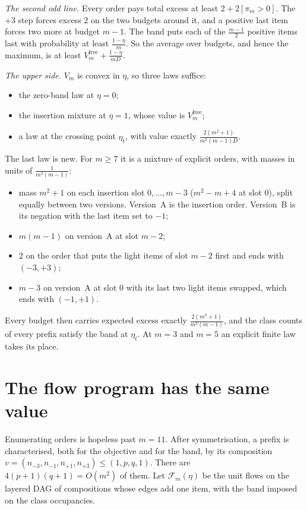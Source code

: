 \emph{The second odd line.} Every order pays total excess at least $2+2[\pi_{m}>0]$. The
$+3$ step forces excess $2$ on the two budgets around it, and a positive last item forces two
more at budget $m-1$. The band puts each of the $\frac{m-1}{2}$ positive items last with
probability at least $\frac{1-\eta}{m}$. So the average over budgets, and hence the maximum,
is at least $V^{\mathrm{free}}_{m}+\frac{1-\eta}{mD}$.

\emph{The upper side.} $V_{m}$ is convex in $\eta$, so three laws suffice:
\begin{itemize}
\item the zero-band law at $\eta=0$;
\item the insertion mixture at $\eta=1$, whose value is $V^{\mathrm{free}}_{m}$;
\item a law at the crossing point $\eta_{t}$, with value exactly
$\frac{2(m^{2}+1)}{m^{2}(m-1)D}$.
\end{itemize}
The last law is new. For $m\ge7$ it is a mixture of explicit orders, with masses in units of
$\frac{1}{m^{2}(m-1)}$:
\begin{itemize}
\item mass $m^{2}+1$ on each insertion slot $0,\dots,m-3$ ($m^{2}-m+4$ at slot $0$), split
equally between two versions. Version~A is the insertion order. Version~B is its negation
with the last item set to $-1$;
\item $m(m-1)$ on version~A at slot $m-2$;
\item $2$ on the order that puts the light items of slot $m-2$ first and ends with
$(-3,+3)$;
\item $m-3$ on version~A at slot $0$ with its last two light items swapped, which ends with
$(-1,+1)$.
\end{itemize}
Every budget then carries expected excess exactly $\frac{2(m^{2}+1)}{m^{2}(m-1)}$, and the
class counts of every prefix satisfy the band at $\eta_{t}$. At $m=3$ and $m=5$ an explicit
finite law takes its place.

\section{The flow program has the same value}
\label{sec:flow}

Enumerating orders is hopeless past $m=11$. After symmetrisation, a prefix is characterised,
both for the objective and for the band, by its composition
$v=(n_{-3},n_{-1},n_{+1},n_{+3})\le(1,p,q,1)$. There are $4(p+1)(q+1)=O(m^{2})$ of them. Let
$\mathcal{F}_{m}(\eta)$ be the unit flows on the layered DAG of compositions whose edges add
one item, with the band imposed on the class occupancies.

